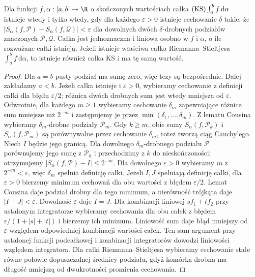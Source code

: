 \begin{twierdzenie}
\label{tw:ks-cauchy}
Dla funkcji $f,\alpha:[a,b]\to\R$ o skończonych wartościach całka $(\mathrm{KS})\int_a^b f\,\mathrm d\alpha$ istnieje wtedy i tylko wtedy, gdy dla każdego $\varepsilon>0$ istnieje cechowanie $\delta$ takie, że
$|S_\alpha(f,\mathcal P)-S_\alpha(f,\mathcal Q)|<\varepsilon$ dla dowolnych dwóch $\delta$-drobnych podziałów znaczonych $\mathcal P,\mathcal Q$. Całka jest jednoznaczna i liniowa osobno w $f$ i $\alpha$, o ile rozważane całki istnieją. Jeżeli istnieje właściwa całka Riemanna--Stieltjesa $\int_a^b f\,\mathrm d\alpha$, to istnieje również całka KS i ma tę samą wartość.
\end{twierdzenie}
\begin{proof}
Dla $a=b$ pusty podział ma sumę zero, więc tezy są bezpośrednie. Dalej zakładamy $a<b$. Jeżeli całka istnieje i $\varepsilon>0$, wybieramy cechowanie z definicji całki dla błędu $\varepsilon/2$; różnica dwóch drobnych sum jest wtedy mniejsza od $\varepsilon$. Odwrotnie, dla każdego $m\ge1$ wybieramy cechowanie $\delta_m$ zapewniające różnice sum mniejsze niż $2^{-m}$ i zastępujemy je przez $\min(\delta_1,\ldots,\delta_m)$. Z lematu Cousina wybieramy $\delta_m$-drobne podziały $\mathcal P_m$. Gdy $k\ge m$, obie sumy $S_\alpha(f,\mathcal P_k)$ i $S_\alpha(f,\mathcal P_m)$ są porównywalne przez cechowanie $\delta_m$, toteż tworzą ciąg Cauchy'ego. Niech $I$ będzie jego granicą. Dla dowolnego $\delta_m$-drobnego podziału $\mathcal P$ porównujemy jego sumę z $\mathcal P_k$ i przechodzimy z $k$ do nieskończoności; otrzymujemy $|S_\alpha(f,\mathcal P)-I|\le2^{-m}$. Dla dowolnego $\varepsilon>0$ wybieramy $m$ z $2^{-m}<\varepsilon$, więc $\delta_m$ spełnia definicję całki. Jeżeli $I,J$ spełniają definicję całki, dla
$\varepsilon>0$ bierzemy minimum cechowań dla obu wartości
z błędem $\varepsilon/2$. Lemat Cousina daje podział drobny
dla tego minimum, a nierówność trójkąta daje $|I-J|<\varepsilon$.
Dowolność $\varepsilon$ daje $I=J$.
Dla kombinacji liniowej $s f_1+t f_2$ przy ustalonym
integratorze wybieramy cechowania dla obu całek z błędem
$\varepsilon/(1+|s|+|t|)$ i bierzemy ich minimum.
Liniowość sum daje błąd mniejszy od $\varepsilon$ względem
odpowiedniej kombinacji wartości całek. Ten sam argument
przy ustalonej funkcji podcałkowej i kombinacji integratorów
dowodzi liniowości względem integratora. Dla całki Riemanna--Stieltjesa wybieramy cechowanie stałe równe połowie dopuszczalnej średnicy podziału, gdyż komórka drobna ma długość mniejszą od dwukrotności promienia cechowania.
\end{proof}

